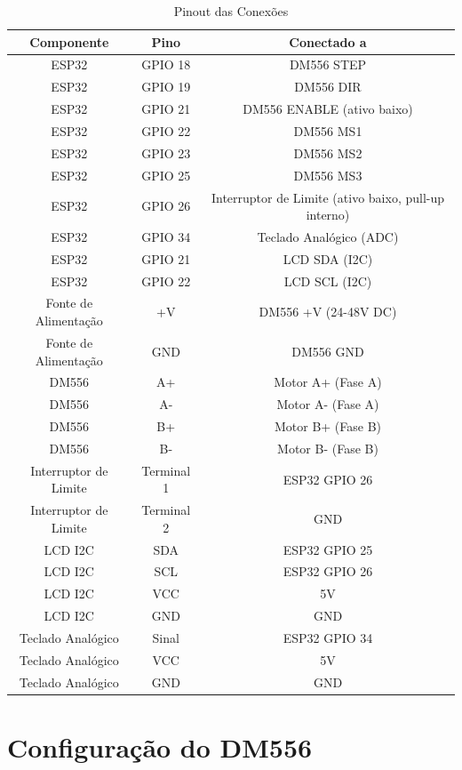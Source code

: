 \documentclass{article}
\begin{document}
\begin{table}[h]
\centering
\caption{Pinout das Conexões}
\begin{tabular}{|c|c|c|}
\hline
\textbf{Componente} & \textbf{Pino} & \textbf{Conectado a} \\
\hline
ESP32 & GPIO 18 & DM556 STEP \\
ESP32 & GPIO 19 & DM556 DIR \\
ESP32 & GPIO 21 & DM556 ENABLE (ativo baixo) \\
ESP32 & GPIO 22 & DM556 MS1 \\
ESP32 & GPIO 23 & DM556 MS2 \\
ESP32 & GPIO 25 & DM556 MS3 \\
ESP32 & GPIO 26 & Interruptor de Limite (ativo baixo, pull-up interno) \\
ESP32 & GPIO 34 & Teclado Analógico (ADC) \\
ESP32 & GPIO 21 & LCD SDA (I2C) \\
ESP32 & GPIO 22 & LCD SCL (I2C) \\
\hline
Fonte de Alimentação & +V & DM556 +V (24-48V DC) \\
Fonte de Alimentação & GND & DM556 GND \\
\hline
DM556 & A+ & Motor A+ (Fase A) \\
DM556 & A- & Motor A- (Fase A) \\
DM556 & B+ & Motor B+ (Fase B) \\
DM556 & B- & Motor B- (Fase B) \\
\hline
Interruptor de Limite & Terminal 1 & ESP32 GPIO 26 \\
Interruptor de Limite & Terminal 2 & GND \\
\hline
LCD I2C & SDA & ESP32 GPIO 25 \\
LCD I2C & SCL & ESP32 GPIO 26 \\
LCD I2C & VCC & 5V \\
LCD I2C & GND & GND \\
\hline
Teclado Analógico & Sinal & ESP32 GPIO 34 \\
Teclado Analógico & VCC & 5V \\
Teclado Analógico & GND & GND \\
\hline
\end{tabular}
\end{table}

\section{Configuração do DM556}
\end{document}
